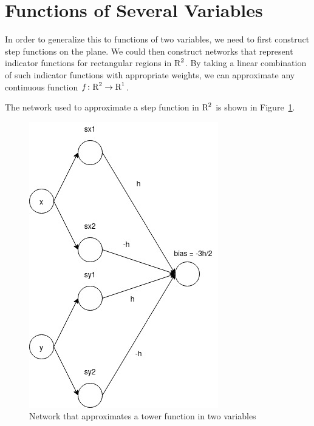 \section{Functions of Several Variables}

In order to generalize this to functions of two variables, we need to first 
construct step functions on the plane. We could then construct networks 
that represent indicator functions for rectangular regions in $\text{R}^2$. By taking a 
linear combination of such indicator functions with appropriate weights, we can 
approximate any continuous function $f \colon \text{R}^2 \to \text{R}^1$. 

The network used to approximate a step function in $\text{R}^2$ is shown in 
Figure~\ref{fig:tower_function}.
\begin{figure}[ht]
\begin{center}
\includegraphics[scale=0.5]{TowerFunction.jpg}
\end{center}
\caption{Network that approximates a tower function in two variables}
\label{fig:tower_function}
\end{figure}


